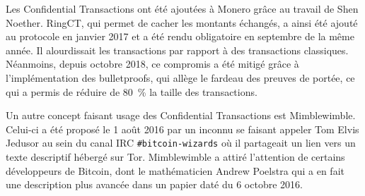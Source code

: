 Les Confidential Transactions ont été ajoutées à Monero grâce au travail de Shen Noether.  RingCT, qui permet de cacher les montants échangés, a ainsi été ajouté au protocole en janvier 2017 et a été rendu obligatoire en septembre de la même année. Il alourdissait les transactions par rapport à des transactions classiques. Néanmoins, depuis octobre 2018, ce compromis a été mitigé grâce à l'implémentation des bulletproofs, qui allège le fardeau des preuves de portée, ce qui a permis de réduire de 80~\% la taille des transactions.


Un autre concept faisant usage des Confidential Transactions est Mimblewimble. Celui-ci a été proposé le 1\ier{} août 2016 par un inconnu se faisant appeler Tom Elvis Jedusor au sein du canal IRC \texttt{\#bitcoin-wizards} où il partageait un lien vers un texte descriptif hébergé sur Tor. Mimblewimble a attiré l'attention de certains développeurs de Bitcoin, dont le mathématicien Andrew Poelstra qui a en fait une description plus avancée dans un papier daté du 6 octobre 2016.

